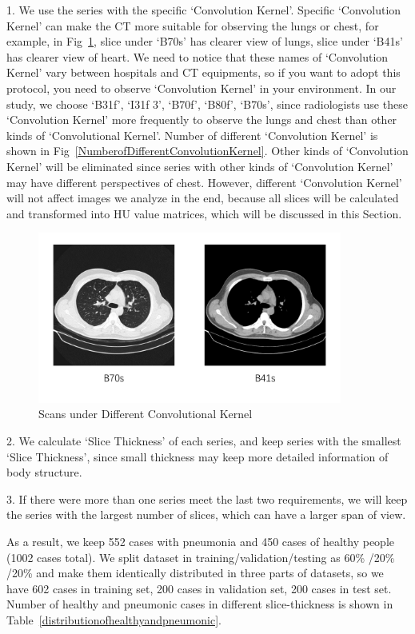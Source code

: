 \documentclass[journal]{IEEEtran}
\begin{document}
1. We use the series with the specific `Convolution Kernel'. Specific `Convolution Kernel' can make the CT more suitable for observing the lungs or chest, for example, in Fig~\ref{Bs}, slice under `B70s' has clearer view of lungs, slice under `B41s' has clearer view of heart. We need to notice that these names of `Convolution Kernel' vary between hospitals and CT equipments, so if you want to adopt this protocol, you need to observe `Convolution Kernel' in your environment. In our study, we choose `B31f', `I31f 3', `B70f', `B80f', `B70s', since radiologists use these `Convolution Kernel'  more frequently to observe the lungs and chest than other kinds of `Convolutional Kernel'. Number of different `Convolution Kernel' is shown in Fig~\ref{NumberofDifferentConvolutionKernel}. Other kinds of `Convolution Kernel' will be eliminated since series with other kinds of `Convolution Kernel' may have different perspectives of chest.
However, different `Convolution Kernel' will not affect images we analyze in the end, because all slices will be calculated and transformed into HU value matrices, which will be discussed in this Section.

\begin{figure}[t]
    \centerline{\includegraphics[width=100mm]{Bs.pdf}}
    \vspace{-0cm}
    \caption{Scans under Different Convolutional Kernel}
    \vspace{-0cm}
    \label{Bs}
    \end{figure}

2. We calculate `Slice Thickness' of each series, and keep series with the smallest `Slice Thickness', since small thickness may keep more detailed information of body structure. 

3. If there were more than one series meet the last two requirements, we will keep the series with the largest number of slices, which can have a larger span of view.

As a result, we keep 552 cases with pneumonia and 450 cases of healthy people (1002 cases total).
We split dataset in training/validation/testing as 60\% /20\% /20\% and make them identically distributed in three parts of datasets, so we have 602 cases in training set, 200 cases in validation set, 200 cases in test set.
Number of healthy and pneumonic cases in different slice-thickness is shown in Table~\ref{distributionofhealthyandpneumonic}.
\end{document}
